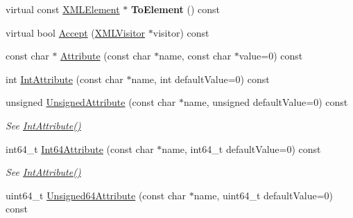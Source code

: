 \begin{DoxyCompactItemize}
\mbox{\label{classtinyxml2_1_1_x_m_l_element_afeb353047ab8532191709dcaef07337e}} 
virtual const \hyperlink{classtinyxml2_1_1_x_m_l_element}{X\+M\+L\+Element} $\ast$ {\bfseries To\+Element} () const
\item 
virtual bool \hyperlink{classtinyxml2_1_1_x_m_l_element_a9b2119831e8b85827d5d3e5076788e4a}{Accept} (\hyperlink{classtinyxml2_1_1_x_m_l_visitor}{X\+M\+L\+Visitor} $\ast$visitor) const
\item 
const char $\ast$ \hyperlink{classtinyxml2_1_1_x_m_l_element_a48cf4a315cfbac7d74cd0d5ff2c5df51}{Attribute} (const char $\ast$name, const char $\ast$value=0) const
\item 
int \hyperlink{classtinyxml2_1_1_x_m_l_element_a95a89b13bb14a2d4655e2b5b406c00d4}{Int\+Attribute} (const char $\ast$name, int default\+Value=0) const
\item 
\mbox{\label{classtinyxml2_1_1_x_m_l_element_afea43a1d4aa33e3703ddee5fc9adc26c}} 
unsigned \hyperlink{classtinyxml2_1_1_x_m_l_element_afea43a1d4aa33e3703ddee5fc9adc26c}{Unsigned\+Attribute} (const char $\ast$name, unsigned default\+Value=0) const
\begin{DoxyCompactList}\small\item\em See \hyperlink{classtinyxml2_1_1_x_m_l_element_a95a89b13bb14a2d4655e2b5b406c00d4}{Int\+Attribute()} \end{DoxyCompactList}\item 
\mbox{\label{classtinyxml2_1_1_x_m_l_element_a66d96972adecd816194191f13cc4a0a0}} 
int64\+\_\+t \hyperlink{classtinyxml2_1_1_x_m_l_element_a66d96972adecd816194191f13cc4a0a0}{Int64\+Attribute} (const char $\ast$name, int64\+\_\+t default\+Value=0) const
\begin{DoxyCompactList}\small\item\em See \hyperlink{classtinyxml2_1_1_x_m_l_element_a95a89b13bb14a2d4655e2b5b406c00d4}{Int\+Attribute()} \end{DoxyCompactList}\item 
\mbox{\label{classtinyxml2_1_1_x_m_l_element_a226502bab8f1be7ede1fdd255398eb85}} 
uint64\+\_\+t \hyperlink{classtinyxml2_1_1_x_m_l_element_a226502bab8f1be7ede1fdd255398eb85}{Unsigned64\+Attribute} (const char $\ast$name, uint64\+\_\+t default\+Value=0) const

\end{DoxyCompactItemize}

